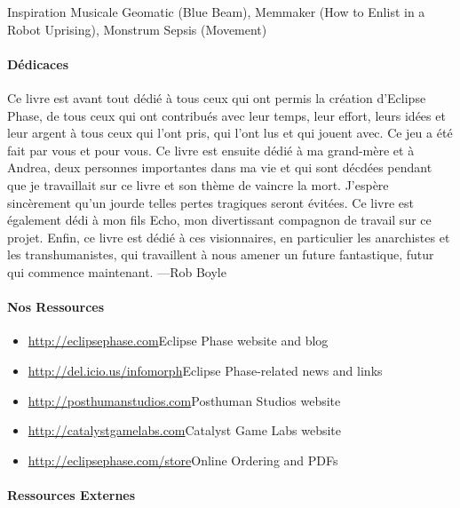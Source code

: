 \begin{description}
\item{Inspiration Musicale} Geomatic (Blue Beam), Memmaker (How to Enlist in a Robot Uprising), Monstrum Sepsis (Movement) 

\end{description} 

\pagebreak



\paragraph{Dédicaces} 

Ce livre est avant tout dédié à tous ceux qui ont permis la création d'Eclipse Phase, de tous ceux qui ont contribués avec leur temps, leur effort, leurs idées et leur argent à tous ceux qui l'ont pris, qui l'ont lus et qui jouent avec. Ce jeu a été fait par vous et pour vous. Ce livre est ensuite dédié à ma grand-mère et à Andrea, deux personnes importantes dans ma vie et qui sont décdées pendant que je travaillait sur ce livre et son thème de vaincre la mort. J'espère sincèrement qu'un jourde telles pertes tragiques seront évitées. Ce livre est également dédi à mon fils Echo, mon divertissant compagnon de travail sur ce projet. Enfin, ce livre est dédié à ces visionnaires, en particulier les anarchistes et les transhumanistes, qui travaillent à nous amener un future fantastique, futur qui commence maintenant. —Rob Boyle 

\paragraph{Nos Ressources} 

\begin{itemize} \item \url{http://eclipsephase.com}{Eclipse Phase website and blog} \item \url{http://del.icio.us/infomorph}{Eclipse Phase-related news and links} \item \url{http://posthumanstudios.com}{Posthuman Studios website} \item \url{http://catalystgamelabs.com}{Catalyst Game Labs website} \item \url{http://eclipsephase.com/store}{Online Ordering and PDFs} \end{itemize} 

\paragraph{Ressources Externes} \label{sec:outside-resources} 

